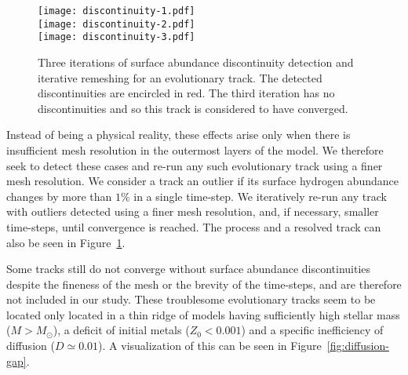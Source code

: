 \begin{figure}[t!]
    \centering
    \texttt{[image: discontinuity-1.pdf]}\\
    \texttt{[image: discontinuity-2.pdf]}\\
    \texttt{[image: discontinuity-3.pdf]}\\
    \caption[Surface abundance discontinuity detection]{Three iterations of surface abundance discontinuity detection and iterative remeshing for an evolutionary track. The detected discontinuities are encircled in red. The third iteration has no discontinuities and so this track is considered to have converged. \vspace*{5mm} \label{fig:discontinuity} }
\end{figure}

Instead of being a physical reality, these effects arise only when there is insufficient mesh resolution in the outermost layers of the model. We therefore seek to detect these cases and re-run any such evolutionary track using a finer mesh resolution. We consider a track an outlier if its surface hydrogen abundance changes by more than $1\%$ in a single time-step. We iteratively re-run any track with outliers detected using a finer mesh resolution, and, if necessary, smaller time-steps, until convergence is reached. The process and a resolved track can also be seen in Figure~\ref{fig:discontinuity}. 

Some tracks still do not converge without surface abundance discontinuities despite the fineness of the mesh or the brevity of the time-steps, and are therefore not included in our study. These troublesome evolutionary tracks seem to be located only located in a thin ridge of models having sufficiently high stellar mass (${M > M_\odot}$), a deficit of initial metals (${Z_0 < 0.001}$) and a specific inefficiency of diffusion (${D \simeq 0.01}$). A visualization of this can be seen in Figure~\ref{fig:diffusion-gap}.

